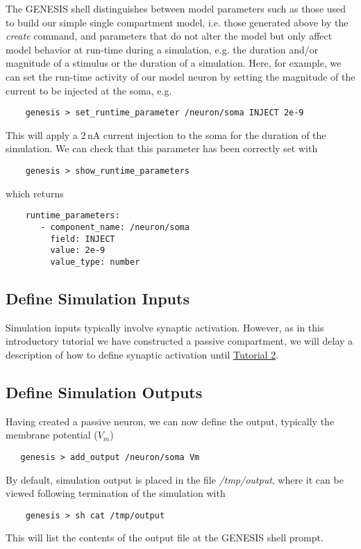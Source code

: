 \documentclass[12pt]{article}
\begin{document}
The GENESIS shell distinguishes between model parameters such as those used to build our simple single compartment model, i.e. those generated above by the {\it create} command, and parameters that do not alter the model but only affect model behavior at run-time during a simulation, e.g. the duration and/or magnitude of a stimulus or the duration of a simulation. Here, for example, we can set the run-time activity of our model neuron by setting the magnitude of the current to be injected at the soma, e.g. 
\begin{verbatim}
    genesis > set_runtime_parameter /neuron/soma INJECT 2e-9
\end{verbatim}
This will apply a 2\,nA current injection to the soma for the duration of the simulation. We can check that this parameter has been correctly set with
\begin{verbatim}
    genesis > show_runtime_parameters
\end{verbatim}
which returns
\begin{verbatim}
    runtime_parameters:
       - component_name: /neuron/soma
         field: INJECT
         value: 2e-9
         value_type: number
\end{verbatim}

\subsection*{Define Simulation Inputs}

Simulation inputs typically involve synaptic activation. However, as in this introductory tutorial we have constructed a passive compartment, we will delay a description of how to define synaptic activation until \href{../tutorial2/tutorial2.pdf}{Tutorial 2}.  

\subsection*{Define Simulation Outputs}

Having created a passive neuron, we can now define the output, typically the membrane potential ($V_m$)
\begin{verbatim}
   genesis > add_output /neuron/soma Vm
\end{verbatim}
By default, simulation output is placed in the file {\it /tmp/output}, where it can be viewed following termination of the simulation with
\begin{verbatim}
    genesis > sh cat /tmp/output
\end{verbatim}
This will list the contents of the output file at the GENESIS shell prompt.
\end{document}

